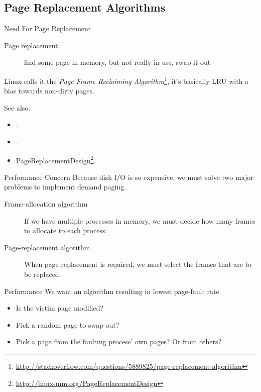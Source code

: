 \subsection{Page Replacement Algorithms}

\begin{frame}{Need For Page Replacement}
  \begin{description}
  \item[Page replacement:] find some page in memory, but not really in use, swap it out
  \end{description}
  \begin{center}
  \end{center}
\end{frame}

Linux calls it the \emph{Page Frame Reclaiming
  Algorithm}\footnote{\url{http://stackoverflow.com/questions/5889825/page-replacement-algorithm}},
it's basically LRU with a bias towards non-dirty pages.

See also:
\begin{itemize}
\item {}.
\item {}.
\item PageReplacementDesign\footnote{\url{http://linux-mm.org/PageReplacementDesign}}.
\end{itemize}

\begin{frame}{Performance Concern}
  Because disk I/O is so expensive, we must solve two major problems to implement demand
  paging.
  \begin{description}
  \item[Frame-allocation algorithm] If we have multiple processes in memory, we must
    decide how many frames to allocate to each process.
  \item[Page-replacement algorithm] When page replacement is required, we must select the
    frames that are to be replaced.
  \end{description}
  \begin{block}{Performance}
    We want an algorithm resulting in lowest page-fault rate
    \begin{itemize}
    \item Is the victim page modified?
    \item Pick a random page to swap out?
    \item Pick a page from the faulting process' own pages? Or from others?
    \end{itemize}
  \end{block}
\end{frame}

